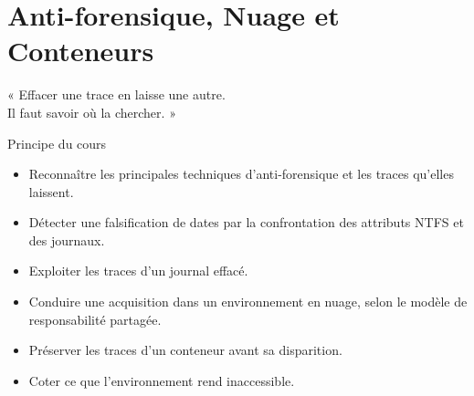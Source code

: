 
\chapter{Anti-forensique, Nuage et Conteneurs}
\label{chap:antiforensique}

\epigraph{%
    « Effacer une trace en laisse une autre.\\
    Il faut savoir où la chercher. »%
}{Principe du cours}


\begin{boxobjectifs}
\begin{itemize}
    \item Reconnaître les principales techniques d'anti-forensique et les
          traces qu'elles laissent.
    \item Détecter une falsification de dates par la confrontation des
          attributs NTFS et des journaux.
    \item Exploiter les traces d'un journal effacé.
    \item Conduire une acquisition dans un environnement en nuage, selon le
          modèle de responsabilité partagée.
    \item Préserver les traces d'un conteneur avant sa disparition.
    \item Coter \NEK{} ce que l'environnement rend inaccessible.
\end{itemize}
\end{boxobjectifs}

